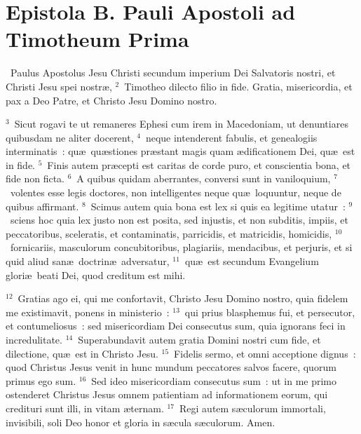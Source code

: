 {\centering \section*{Epistola B. Pauli Apostoli ad Timotheum Prima}}\thispagestyle{empty}

~\lettrine[lines=10,image=true,loversize=0.05,lraise=-0.03]{P}{}aulus Apostolus Jesu Christi secundum imperium Dei Salvatoris nostri, et Christi Jesu spei nostr\ae ,
${}^{2}$~Timotheo dilecto filio in fide. Gratia, misericordia, et pax a Deo Patre, et Christo Jesu Domino nostro.


${}^{3}$~Sicut rogavi te ut remaneres Ephesi cum irem in Macedoniam, ut denuntiares quibusdam ne aliter docerent,
${}^{4}$~neque intenderent fabulis, et genealogiis interminatis~: qu\ae\ qu\ae stiones pr\ae stant magis quam \ae dificationem Dei, qu\ae\ est in fide.
${}^{5}$~Finis autem pr\ae cepti est caritas de corde puro, et conscientia bona, et fide non ficta.
${}^{6}$~A quibus quidam aberrantes, conversi sunt in vaniloquium,
${}^{7}$~volentes esse legis doctores, non intelligentes neque qu\ae\ loquuntur, neque de quibus affirmant.
${}^{8}$~Scimus autem quia bona est lex si quis ea legitime utatur~:
${}^{9}$~sciens hoc quia lex justo non est posita, sed injustis, et non subditis, impiis, et peccatoribus, sceleratis, et contaminatis, parricidis, et matricidis, homicidis,
${}^{10}$~fornicariis, masculorum concubitoribus, plagiariis, mendacibus, et perjuris, et si quid aliud san\ae\ doctrin\ae\ adversatur,
${}^{11}$~qu\ae\ est secundum Evangelium glori\ae\ beati Dei, quod creditum est mihi.


${}^{12}$~Gratias ago ei, qui me confortavit, Christo Jesu Domino nostro, quia fidelem me existimavit, ponens in ministerio~:
${}^{13}$~qui prius blasphemus fui, et persecutor, et contumeliosus~: sed misericordiam Dei consecutus sum, quia ignorans feci in incredulitate.
${}^{14}$~Superabundavit autem gratia Domini nostri cum fide, et dilectione, qu\ae\ est in Christo Jesu.
${}^{15}$~Fidelis sermo, et omni acceptione dignus~: quod Christus Jesus venit in hunc mundum peccatores salvos facere, quorum primus ego sum.
${}^{16}$~Sed ideo misericordiam consecutus sum~: ut in me primo ostenderet Christus Jesus omnem patientiam ad informationem eorum, qui credituri sunt illi, in vitam \ae ternam.
${}^{17}$~Regi autem s\ae culorum immortali, invisibili, soli Deo honor et gloria in s\ae cula s\ae culorum. Amen.


